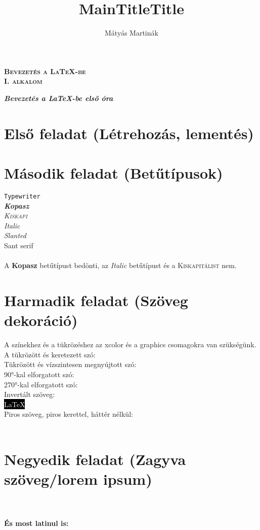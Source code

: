 \documentclass{book}
\begin{document}
	\begin{titlepage}
		\begin{center}
			\title{MainTitle}\textbf{\huge{\textsc{Bevezetés a \LaTeX-be\\
			\textbf{I. alkalom}}}}
		\end{center}
	\end{titlepage}
\title{Title}\textbf{\huge{\textit{Bevezetés a \LaTeX-be első óra}}}
\author{Mátyás Martinák}
\section{Első feladat (Létrehozás, lementés)}
\section{Második feladat (Betűtípusok)}
	\texttt{Typewriter}\\
	\emph{\textbf{Kopasz}}\\
	\emph{\textsc{Kiskapi}}\\
	\emph{\textit{Italic}}\\
	\textsl{Slanted}\\
	\textsf{Sant serif}\\\\
	A \textbf{Kopasz} betűtípust bedönti, az \textit{Italic} betűtípust és a \textsc{Kiskapitálist} nem.
\section{Harmadik feladat (Szöveg dekoráció)}
	A színekhez és a tükrözéshez az xcolor és a graphics csomagokra van szükségünk.\\
	A tükrözött és keretezett szó: \\
	Tükrözött és vízszintesen megnyújtott szó: \scalebox{2.0}{\scalebox{-1}[1]{\hulipsum[1]}}\\
	90°-kal elforgatott szó: \\
	270°-kal elforgatott szó: \\
	Invertált szöveg:\\
	\colorbox{black}{\textcolor{white}{\LaTeX}}\\
	Piros szöveg, piros kerettel, háttér nélkül:\\
	\\
\clearpage
\section{Negyedik feladat (Zagyva szöveg/lorem ipsum)}
	\hulipsum[1]\\\\
	\textbf{És most latinul is:}\\
	\begin{flushright}
		\begin{otherlanguage}{latin}
			\lipsum[1]
		\end{otherlanguage}
	\end{flushright}
	\linespread{2}
\end{document}
